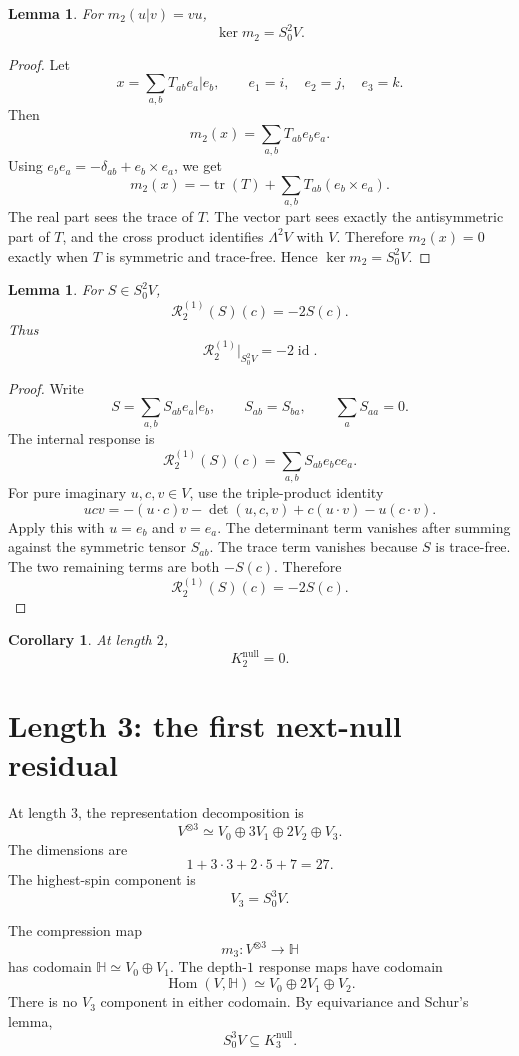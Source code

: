 \documentclass[11pt]{article}
\newtheorem{lemma}[theorem]{Lemma}
\newtheorem{corollary}[theorem]{Corollary}
\theoremstyle{definition}
\newcommand{\Ker}{\operatorname{ker}}
\newcommand{\Hom}{\operatorname{Hom}}
\begin{document}
\begin{lemma}
\label{lem:kerm2}
For $m_2(u|v)=vu$,
\[
  \Ker m_2=S^2_0V.
\]
\end{lemma}

\begin{proof}
Let
\[
  x=\sum_{a,b}T_{ab}e_a|e_b,
  \qquad
  e_1=i,
  \quad e_2=j,
  \quad e_3=k.
\]
Then
\[
  m_2(x)=\sum_{a,b}T_{ab}e_be_a.
\]
Using $e_be_a=-\delta_{ab}+e_b\times e_a$, we get
\[
  m_2(x)=-\operatorname{tr}(T)+\sum_{a,b}T_{ab}(e_b\times e_a).
\]
The real part sees the trace of $T$.
The vector part sees exactly the antisymmetric part of $T$, and the cross product identifies $\Lambda^2V$ with $V$.
Therefore $m_2(x)=0$ exactly when $T$ is symmetric and trace-free.
Hence $\Ker m_2=S^2_0V$.
\end{proof}

\begin{lemma}
\label{lem:r2}
For $S\in S^2_0V$,
\[
  \mathcal{R}_2^{(1)}(S)(c)=-2S(c).
\]
Thus
\[
  \mathcal{R}_2^{(1)}|_{S^2_0V}=-2\operatorname{id}.
\]
\end{lemma}

\begin{proof}
Write
\[
  S=\sum_{a,b}S_{ab}e_a|e_b,
  \qquad S_{ab}=S_{ba},
  \qquad \sum_a S_{aa}=0.
\]
The internal response is
\[
  \mathcal{R}_2^{(1)}(S)(c)=\sum_{a,b}S_{ab}e_bce_a.
\]
For pure imaginary $u,c,v\in V$, use the triple-product identity
\[
  ucv=-(u\cdot c)v-\det(u,c,v)+c(u\cdot v)-u(c\cdot v).
\]
Apply this with $u=e_b$ and $v=e_a$.
The determinant term vanishes after summing against the symmetric tensor $S_{ab}$.
The trace term vanishes because $S$ is trace-free.
The two remaining terms are both $-S(c)$.
Therefore
\[
  \mathcal{R}_2^{(1)}(S)(c)=-2S(c).
\]
\end{proof}

\begin{corollary}
\label{cor:k2null}
At length $2$,
\[
  K_2^{\mathrm{null}}=0.
\]
\end{corollary}

\section{Length 3: the first next-null residual}

At length $3$, the representation decomposition is
\[
  V^{\otimes3}\simeq V_0\oplus3V_1\oplus2V_2\oplus V_3.
\]
The dimensions are
\[
  1+3\cdot3+2\cdot5+7=27.
\]
The highest-spin component is
\[
  V_3=S^3_0V.
\]

The compression map
\[
  m_3:V^{\otimes3}\to\mathbb{H}
\]
has codomain $\mathbb{H}\simeq V_0\oplus V_1$.
The depth-$1$ response maps have codomain
\[
  \Hom(V,\mathbb{H})\simeq V_0\oplus2V_1\oplus V_2.
\]
There is no $V_3$ component in either codomain.
By equivariance and Schur's lemma,
\[
  S^3_0V\subseteq K_3^{\mathrm{null}}.
\]
\end{document}
